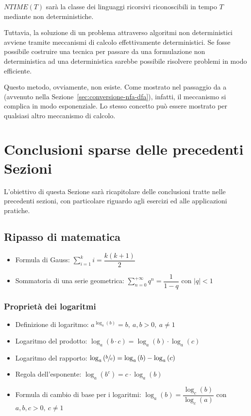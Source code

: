 \documentclass[italian, 10pt]{article}
\begin{document}
\(NTIME(T)\) sarà la classe dei linguaggi ricorsivi riconoscibili in tempo \(T\) mediante \TM non deterministiche.

Tuttavia, la soluzione di un problema attraverso algoritmi non deterministici avviene tramite meccanismi di calcolo effettivamente deterministici.
Se fosse possibile costruire una tecnica  per passare da una formulazione non deterministica ad una deterministica sarebbe possibile risolvere problemi  in modo efficiente.

Questo metodo, ovviamente, non esiste.
Come mostrato nel passaggio da \FSA a \NFA (avvenuto nella Sezione~\ref{sec:conversione-nfa-dfa}), infatti, il meccanismo si complica in modo esponenziale.
Lo stesso concetto può essere mostrato per qualsiasi altro meccanismo di calcolo.

\clearpage

\section{Conclusioni sparse delle precedenti Sezioni}

L'obiettivo di questa Sezione sarà ricapitolare delle conclusioni tratte nelle precedenti sezioni, con particolare riguardo agli esercizi ed alle applicazioni pratiche.

\subsection{Ripasso di matematica}

\begin{itemize}
  \item Formula di Gauss: \(\displaystyle \sum_{i=1}^k i = \dfrac{k(k+1)}{2}\)
  \item Sommatoria di una serie geometrica: \(\displaystyle \sum_{n=0}^{+\infty} q^n = \dfrac{1}{1-q}\) con \(|q| < 1\)
\end{itemize}

\subsubsection{Proprietà dei logaritmi}

\begin{itemize}
  \item Definizione di logaritmo:  \(a^{\log_a{(b)}} = b,\ a, b > 0,\ a \neq 1\)
  \item Logaritmo del prodotto: \(\log_a{(b \cdot c)} = \log_a{(b) \cdot \log_a{(c)}}\)
  \item Logaritmo del rapporto: \(\log_a{\left(\sfrac{b}{c}\right)} = \log_a{(b)} - \log_a{(c)}\)
  \item Regola dell'esponente: \(\log_a{\left(b^c\right)} = c \cdot \log_a{(b)}\)
  \item Formula di cambio di base per i logaritmi: \(\log_a{(b)} = \dfrac{\log_c{(b)}}{\log_c{(a)}}\) con \(a, b, c > 0,\ c \neq 1\)
\end{itemize}
\end{document}
